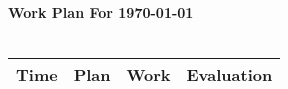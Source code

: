 \documentclass{article}
\begin{document}
\begin{table} 

{\huge \bf Work Plan For \today }
{\huge \bf \,\FilledWeakRainCloud\,}\\
\phantom{stuff} \\

\centering
\begin{tabular}{|l|l|l|l|}
\hline

{\bf \phantom{xxx}Time\phantom{xxx}}
 & {\bf \phantom{xxxxxxxxxxxx}Plan\phantom{xxxxxxxxxxxx}}
 & {\bf \phantom{xxxxxxxxxxxx}Work\phantom{xxxxxxxxxxxx}}
 & {\bf \phantom{xxx}Evaluation\phantom{xxx}}
 \\
\hline




\end{tabular}
\end{table}
\end{document}

